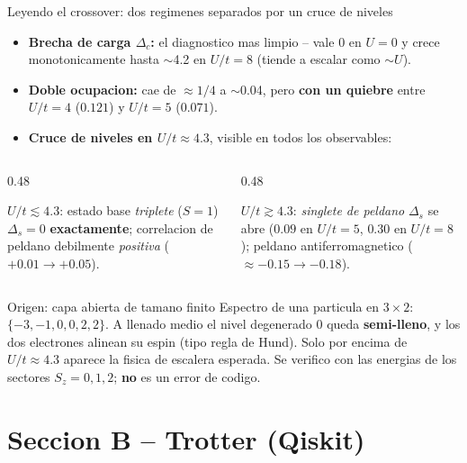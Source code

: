 \documentclass[aspectratio=169,10pt]{beamer}
\newcommand{\warn}[1]{\textcolor{qWarn}{\textbf{#1}}}
\begin{document}
\begin{frame}{Leyendo el crossover: dos regimenes separados por un cruce de niveles}
  \small
  \begin{itemize}
    \item \textbf{Brecha de carga $\Delta_c$:} el diagnostico mas limpio -- vale $0$ en $U=0$
      y crece monotonicamente hasta $\sim$4.2 en $U/t=8$ (tiende a escalar como $\sim U$).
    \item \textbf{Doble ocupacion:} cae de $\approx1/4$ a $\sim$0.04, pero \warn{con un
      quiebre} entre $U/t=4$ ($0.121$) y $U/t=5$ ($0.071$).
    \item \warn{Cruce de niveles en $U/t\approx4.3$}, visible en todos los observables:
  \end{itemize}
  \vspace{-0.3em}
  \begin{columns}[T]
    \begin{column}{0.48\textwidth}
      \begin{block}{$U/t\lesssim4.3$: estado base \emph{triplete} ($S=1$)}
        $\Delta_s=0$ \textbf{exactamente}; correlacion de peldano debilmente
        \emph{positiva} ($+0.01\to+0.05$).
      \end{block}
    \end{column}
    \begin{column}{0.48\textwidth}
      \begin{block}{$U/t\gtrsim4.3$: \emph{singlete de peldano}}
        $\Delta_s$ se abre ($0.09$ en $U/t=5$, $0.30$ en $U/t=8$); peldano
        antiferromagnetico ($\approx-0.15\to-0.18$).
      \end{block}
    \end{column}
  \end{columns}
  \vspace{0.4em}
  \begin{alertblock}{Origen: capa abierta de tamano finito}
    Espectro de una particula en $3\times2$: $\{-3,-1,0,0,2,2\}$. A llenado medio el nivel
    degenerado $0$ queda \textbf{semi-lleno}, y los dos electrones alinean su espin (tipo
    regla de Hund). Solo por encima de $U/t\approx4.3$ aparece la fisica de escalera
    esperada. Se verifico con las energias de los sectores $S_z=0,1,2$; \textbf{no} es un error
    de codigo.
  \end{alertblock}
\end{frame}

\section{Seccion B -- Trotter (Qiskit)}
\end{document}
